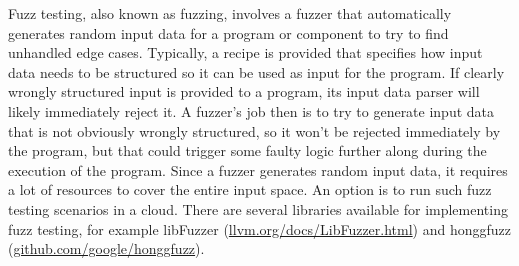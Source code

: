 Fuzz testing, also known as fuzzing, involves a fuzzer that automatically generates random input data for a program or component to try to find unhandled edge cases. Typically, a recipe is provided that specifies how input data needs to be structured so it can be used as input for the program. If clearly wrongly structured input is provided to a program, its input data parser will likely immediately reject it. A fuzzer’s job then is to try to generate input data that is not obviously wrongly structured, so it won’t be rejected immediately by the program, but that could trigger some faulty logic further along during the execution of the program. Since a fuzzer generates random input data, it requires a lot of resources to cover the entire input space. An option is to run such fuzz testing scenarios in a cloud. There are several libraries available for implementing fuzz testing, for example libFuzzer (\url{llvm.org/docs/LibFuzzer.html}) and honggfuzz (\url{github.com/google/honggfuzz}).